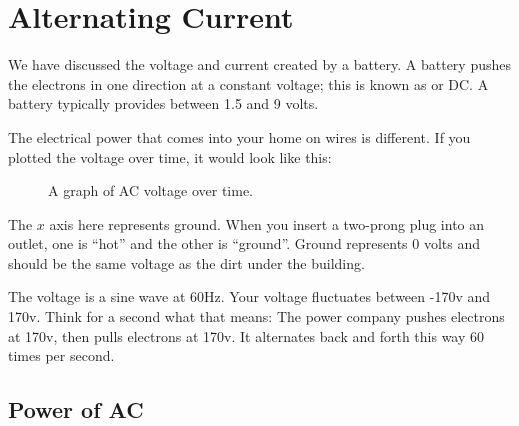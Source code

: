 \chapter{Alternating Current}

We have discussed the voltage and current created by a battery.  A
battery pushes the electrons in one direction at a constant voltage;
this is known as  or DC. A battery typically
provides between 1.5 and 9 volts.

The electrical power that comes into your home on wires is
different. If you plotted the voltage over time, it would look like
this:
\begin{figure}[htbp]
    \centering
    \caption{A graph of AC voltage over time.}
    \label{fig:acvoltsGraph}
\end{figure}

The $x$ axis here represents ground. When you insert a two-prong plug
into an outlet, one is ``hot'' and the other is ``ground''. Ground
represents 0 volts and should be the same voltage as the dirt under
the building.

The voltage is a sine wave at 60Hz. Your voltage fluctuates between
-170v and 170v. Think for a second what that means: The power company
pushes electrons at 170v, then pulls electrons at 170v.  It
alternates back and forth this way 60 times per second.

\section{Power of AC}

